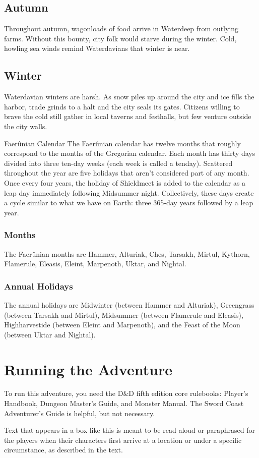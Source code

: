 \documentclass[10pt,a4paper,twoside,twocolumn,openany,nodeprecatedcode]{dndbook}
\begin{document}
\subsection{Autumn}
Throughout autumn, wagonloads of food arrive in Waterdeep from outlying farms. Without this bounty, city folk would starve during the winter. Cold, howling sea winds remind Waterdavians that winter is near.
\subsection{Winter}
Waterdavian winters are harsh. As snow piles up around the city and ice fills the harbor, trade grinds to a halt and the city seals its gates. Citizens willing to brave the cold still gather in local taverns and festhalls, but few venture outside the city walls.
\begin{DndComment}{Faerûnian Calendar}
The Faerûnian calendar has twelve months that roughly correspond to the months of the Gregorian calendar. Each month has thirty days divided into three ten-day weeks (each week is called a tenday). Scattered throughout the year are five holidays that aren't considered part of any month. Once every four years, the holiday of Shieldmeet is added to the calendar as a leap day immediately following Midsummer night. Collectively, these days create a cycle similar to what we have on Earth: three 365-day years followed by a leap year.
\subsubsection{Months}
The Faerûnian months are Hammer, Alturiak, Ches, Tarsakh, Mirtul, Kythorn, Flamerule, Eleasis, Eleint, Marpenoth, Uktar, and Nightal.
\subsubsection{Annual Holidays}
The annual holidays are Midwinter (between Hammer and Alturiak), Greengrass (between Tarsakh and Mirtul), Midsummer (between Flamerule and Eleasis), Highharvestide (between Eleint and Marpenoth), and the Feast of the Moon (between Uktar and Nightal).
\end{DndComment}

\section{Running the Adventure}
To run this adventure, you need the D\&D fifth edition core rulebooks: Player's Handbook, Dungeon Master's Guide, and Monster Manual. The Sword Coast Adventurer's Guide is helpful, but not necessary.
\begin{DndReadAloud}{}
Text that appears in a box like this is meant to be read aloud or paraphrased for the players when their characters first arrive at a location or under a specific circumstance, as described in the text.
\end{DndReadAloud}
\end{document}
